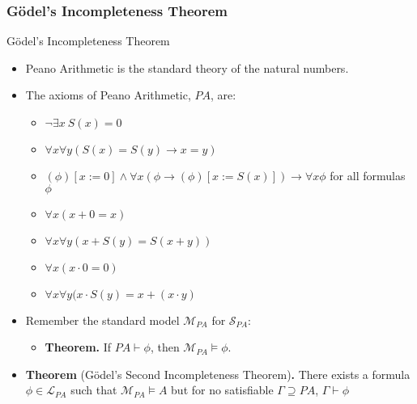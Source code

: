 \documentclass[../slides.tex]{subfiles}
\begin{document}
\subsubsection{G\"odel's Incompleteness Theorem}
\begin{frame}{G\"odel's Incompleteness Theorem}

  \begin{itemize}
  \item Peano Arithmetic is the standard theory of the natural numbers.
  \item The axioms of Peano Arithmetic, $PA$, are:
    \begin{itemize}
    \item $\neg \exists x~S(x)=0$
    \item $\forall x\forall y(S(x)=S(y)\to x=y)$
    \item $(\phi)[x:=0]\land \forall x(\phi\to (\phi)[x:=S(x)])\to
      \forall x\phi$ for all formulas $\phi$
     \item $\forall x(x+0=x)$
     \item $\forall x\forall y(x+S(y)=S(x+y))$
     \item $\forall x(x\cdot 0=0)$
     \item $\forall x\forall y(x\cdot S(y)=x+(x\cdot y)$
    \end{itemize}

   \item Remember the standard model $\mathcal{M}_{PA}$ for
     $\mathcal{S}_{PA}$:

     \begin{itemize}
     \item \textbf{Theorem.} If $PA\vdash \phi$, then
       $\mathcal{M}_{PA}\vDash\phi$.

      
     \end{itemize}

      \item \textbf{Theorem} (G\"odel's Second Incompleteness
         Theorem)\textbf{.} There exists a formula
       $\phi\in\mathcal{L}_{PA}$ such that $\mathcal{M}_{PA}\vDash A$
       but for no satisfiable $\Gamma\supseteq PA$, $\Gamma\vdash \phi$

  \end{itemize}

\end{frame}
\end{document}
